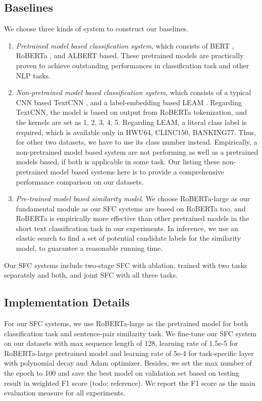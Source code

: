 \documentclass[letterpaper]{article} %
\begin{document}
  \subsection{Baselines}
  We choose three kinds of system to construct our baselines.

  \begin{enumerate}
    \item \emph{Pretrained model based classification system}, which consists of
    BERT \cite{devlin2018bert},  RoBERTa \cite{liu2019roberta},  and  ALBERT  \cite{lan2019albert}  based.  These pretrained
    models  are  practically  proven  to  achieve  outstanding  performances  in
    classification task and other NLP tasks.

    \item   \emph{Non-pretrained   model  based  classification  system},  which
    consists  of  a typical CNN based TextCNN \cite{kim2014convolutional}, and a
    label-embedding based LEAM \cite{wang2018joint}. Regarding TextCNN, the
    model is based on output from RoBERTa tokenization, and the kernels are set
    as 1, 2, 3, 4, 5. Regarding LEAM, a literal class label is required, which
    is available only in HWU64, CLINC150, BANKING77. Thus, for other two
    datasets, we have to use its class number instead.  Empirically,
    a  non-pretrained  model  based  system  are  not  performing  as  well as a
    pretrained  models  based,  if  both is applicable in some task. Our listing
    these  non-pretrained model based systems here is to provide a comprehensive
    performance comparison on our datasets.

    \item   \emph{Pre-trained   model   based   similarity   model}.  We  choose
    RoBERTa-large  as  our  fundamental  module as our SFC systems are based on
    RoBERTa  too, and RoBERTa is empirically more effective than other pretrained
    models  in  the  short  text  classification  task  in  our  experiments. In
    inference,  we  use  an  elastic search to find a set of potential candidate
    labels for the similarity model, to guarantee a reasonable running time.
  \end{enumerate}

  Our SFC systems include two-stage SFC with ablation, trained with two tasks
  separately and both, and joint SFC with all three tasks.

  \subsection{Implementation Details}
  For  our  SFC  systems,  we  use RoBERTa-large as the pretrained model for both
  classification  task  and  sentence-pair similarity task. We fine-tune
  our  SFC  system  on  our datasets with max sequence length of 128,
  learning  rate  of 1.5e-5 for RoBERTa-large pretrained model and learning rate
  of  5e-4  for  task-specific  layer  with polynomial decay and Adam optimizer.
  Besides,  we  set  the  max number of the epoch to 100 and save the best model on
  validation  set based on testing result in weighted F1 score (todo: reference). 
  We report the F1 score as the main evaluation measure for all experiments.
\end{document}
